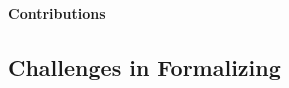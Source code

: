 \paragraph{Contributions}





\subsection{Challenges in Formalizing \ISA}
\label{sec:challenges-in-formalizing-x86}


